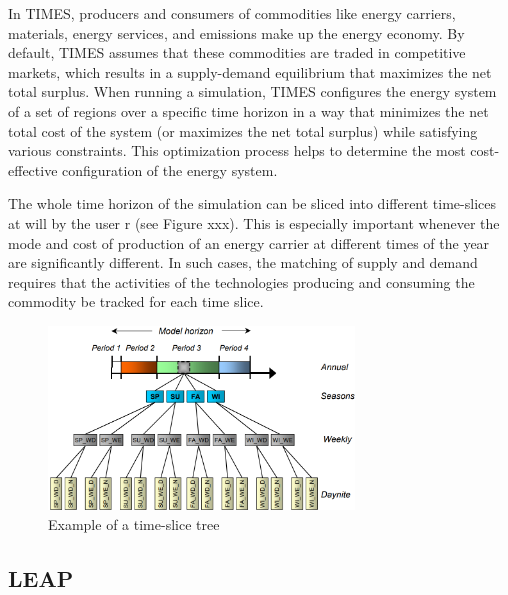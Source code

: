 \documentclass[lettersize,journal]{IEEEtran}
\begin{document}
  In TIMES, producers and consumers of commodities like energy carriers, materials, energy services, and emissions make up the energy economy. By default, TIMES assumes that these commodities are traded in competitive markets, which results in a supply-demand equilibrium that maximizes the net total surplus. When running a simulation, TIMES configures the energy system of a set of regions over a specific time horizon in a way that minimizes the net total cost of the system (or maximizes the net total surplus) while satisfying various constraints. This optimization process helps to determine the most cost-effective configuration of the energy system.

  The whole time horizon of the simulation can be sliced into different time-slices at will by the user r (see Figure xxx). This is especially important whenever the mode and cost of production of an energy carrier at different times of the year are significantly different.  In such cases, the matching of supply and demand requires that the activities of the technologies producing and consuming the commodity be tracked for each time slice.\cite{times-docu}

  \begin{figure}[!t]
  \centering  
  \includegraphics[width=3.2in]{time_horizon.png}
  \caption{Example of a time-slice tree}
  \label{fig1}
  \end{figure}

  \subsection{LEAP}
\end{document}
